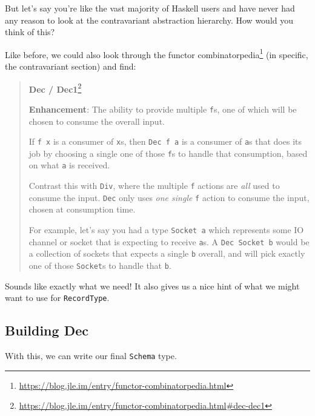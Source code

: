 \documentclass[]{article}
\renewcommand{\href}[2]{#2\footnote{\url{#1}}}
\begin{document}
But let's say you're like the vast majority of Haskell users and have never had
any reason to look at the contravariant abstraction hierarchy. How would you
think of this?

Like before, we could also look through the
\href{https://blog.jle.im/entry/functor-combinatorpedia.html}{functor
combinatorpedia} (in specific, the contravariant section) and find:

\begin{quote}
\href{https://blog.jle.im/entry/functor-combinatorpedia.html\#dec-dec1}{\textbf{Dec
/ Dec1}}

\textbf{Enhancement}: The ability to provide multiple \texttt{f}s, one of which
will be chosen to consume the overall input.

If \texttt{f\ x} is a consumer of \texttt{x}s, then \texttt{Dec\ f\ a} is a
consumer of \texttt{a}s that does its job by choosing a single one of those
\texttt{f}s to handle that consumption, based on what \texttt{a} is received.

Contrast this with \texttt{Div}, where the multiple \texttt{f} actions are
\emph{all} used to consume the input. \texttt{Dec} only uses \emph{one single}
\texttt{f} action to consume the input, chosen at consumption time.

For example, let's say you had a type \texttt{Socket\ a} which represents some
IO channel or socket that is expecting to receive \texttt{a}s. A
\texttt{Dec\ Socket\ b} would be a collection of sockets that expects a single
\texttt{b} overall, and will pick exactly one of those \texttt{Socket}s to
handle that \texttt{b}.
\end{quote}

Sounds like exactly what we need! It also gives us a nice hint of what we might
want to use for \texttt{RecordType}.

\subsection{Building Dec}\label{building-dec}

With this, we can write our final \texttt{Schema} type.
\end{document}
